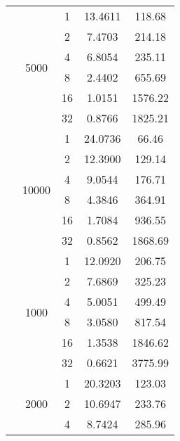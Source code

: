 \begin{tabularx}{\textwidth}{@{} c c c c c @{}}
                            \cmidrule{2-5}
                            & \multirow{6}{*}{5000} & 1  & 13.4611 & 118.68  \\
                            &                       & 2  & 7.4703  & 214.18  \\
                            &                       & 4  & 6.8054  & 235.11  \\
                            &                       & 8  & 2.4402  & 655.69  \\
                            &                       & 16 & 1.0151  & 1576.22 \\
                            &                       & 32 & 0.8766  & 1825.21 \\
                            \cmidrule{2-5}
                            & \multirow{6}{*}{10000} & 1  & 24.0736 & 66.46   \\
                            &                        & 2  & 12.3900 & 129.14  \\
                            &                        & 4  & 9.0544  & 176.71  \\
                            &                        & 8  & 4.3846  & 364.91  \\
                            &                        & 16 & 1.7084  & 936.55  \\
                            &                        & 32 & 0.8562  & 1868.69 \\
\midrule\enlargethispage{-\baselineskip}
    \multirow{24}{*}{50000} & \multirow{6}{*}{1000} & 1  & 12.0920 & 206.75  \\
                            &                       & 2  & 7.6869  & 325.23  \\
                            &                       & 4  & 5.0051  & 499.49  \\
                            &                       & 8  & 3.0580  & 817.54  \\
                            &                       & 16 & 1.3538  & 1846.62 \\
                            &                       & 32 & 0.6621  & 3775.99 \\
                            \cmidrule{2-5}
                            & \multirow{6}{*}{2000} & 1  & 20.3203 & 123.03  \\
                            &                       & 2  & 10.6947 & 233.76  \\
                            &                       & 4  & 8.7424  & 285.96  \\

\end{tabularx}

